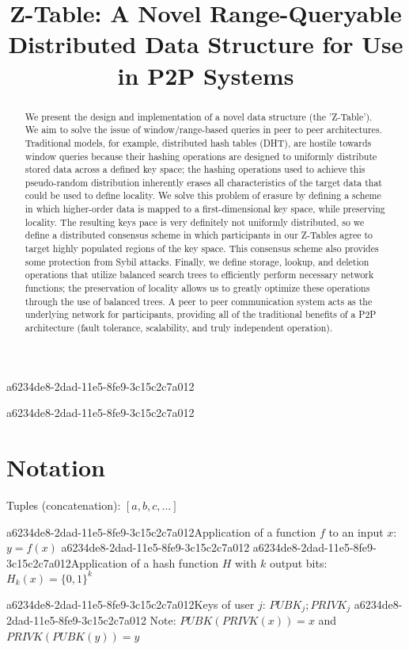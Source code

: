 \documentclass[12pt]{article}
\title{Z-Table: A Novel Range-Queryable Distributed Data Structure for Use in P2P Systems}
\begin{document}
a6234de8-2dad-11e5-8fe9-3c15c2c7a012\maketitle
a6234de8-2dad-11e5-8fe9-3c15c2c7a012
\begin{abstract}
We present the design and implementation of a novel data structure (the 'Z-Table'). We aim to solve the issue of window/range-based queries in peer to peer architectures. Traditional models, for example,  distributed hash tables (DHT), are hostile towards window queries because their hashing operations are designed to uniformly distribute stored data across a defined key space; the hashing operations used to achieve this pseudo-random distribution inherently erases all characteristics of the target data that could be used to define locality. We solve this problem of erasure by defining a scheme in which higher-order data is mapped to a first-dimensional key space, while preserving locality. The resulting keys pace is very definitely not uniformly distributed, so we define a distributed consensus scheme in which participants in our Z-Tables agree to target highly populated regions of the key space. This consensus scheme also provides some protection from Sybil attacks. Finally, we define storage, lookup, and deletion operations that utilize balanced search trees to efficiently perform necessary network functions; the preservation of locality allows us to greatly optimize these operations through the use of balanced trees. A peer to peer communication system acts as the underlying network for participants, providing all of the traditional benefits of a P2P architecture (fault tolerance, scalability, and truly independent operation).
\end{abstract}

\section{Notation}

Tuples (concatenation): $[a,b,c,...]$

a6234de8-2dad-11e5-8fe9-3c15c2c7a012Application of a function $f$ to an input $x$: $y=f(x)$
a6234de8-2dad-11e5-8fe9-3c15c2c7a012
a6234de8-2dad-11e5-8fe9-3c15c2c7a012Application of a hash function $H$ with $k$ output bits: $H_{k}(x) = \{0,1\}^k$

a6234de8-2dad-11e5-8fe9-3c15c2c7a012Keys of user $j$: $ PUBK_j; PRIVK_j $
a6234de8-2dad-11e5-8fe9-3c15c2c7a012
Note: $PUBK(PRIVK(x)) = x$ and $PRIVK(PUBK(y)) = y$~
\end{document}
